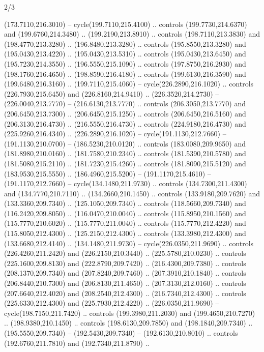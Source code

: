\begin{flagdescription}{2/3}
\begin{scope}[xshift=0.5\flaglength,yshift=0.5\flagwidth,scale=\stretchfactor]
\begin{scope}[scale=0.001645\flagwidth,yshift=65mm,xshift=-63mm]
\begin{scope}[y=0.80pt, x=0.80pt, yscale=-1,]
\begin{scope}[cm={{1.33333,0.0,0.0,1.33333,(0.0,1e-05)}}]
  (173.7110,216.3010) -- cycle(199.7110,215.4100) .. controls
  (199.7730,214.6370) and (199.6760,214.3480) .. (199.2190,213.8910) .. controls
  (198.7110,213.3830) and (198.4770,213.3280) .. (196.8480,213.3280) .. controls
  (195.8550,213.3280) and (195.0430,213.4220) .. (195.0430,213.5310) .. controls
  (195.0430,213.6450) and (195.7230,214.3550) .. (196.5550,215.1090) .. controls
  (197.8750,216.2930) and (198.1760,216.4650) .. (198.8590,216.4180) .. controls
  (199.6130,216.3590) and (199.6480,216.3160) .. (199.7110,215.4060) --
  cycle(226.2890,216.1020) .. controls (226.7930,215.6450) and
  (226.8160,214.9410) .. (226.3520,214.2730) -- (226.0040,213.7770) --
  (216.6130,213.7770) .. controls (206.3050,213.7770) and (206.6450,213.7300) ..
  (206.6450,215.1250) .. controls (206.6450,216.5160) and (206.3130,216.4730) ..
  (216.5550,216.4730) .. controls (224.9180,216.4730) and (225.9260,216.4340) ..
  (226.2890,216.1020) -- cycle(191.1130,212.7660) -- (191.1130,210.0700) --
  (186.5230,210.0120) .. controls (183.0080,209.9650) and (181.8980,210.0160) ..
  (181.7580,210.2340) .. controls (181.5390,210.5780) and (181.5080,215.2110) ..
  (181.7230,215.4260) .. controls (181.8090,215.5120) and (183.9530,215.5550) ..
  (186.4960,215.5200) -- (191.1170,215.4610) -- (191.1170,212.7660) --
  cycle(134.1480,211.9730) .. controls (134.7300,211.4300) and
  (134.7770,210.7110) .. (134.2660,210.1450) .. controls (133.9180,209.7620) and
  (133.3360,209.7340) .. (125.1050,209.7340) .. controls (118.5660,209.7340) and
  (116.2420,209.8050) .. (116.0470,210.0040) .. controls (115.8950,210.1560) and
  (115.7770,210.6020) .. (115.7770,211.0040) .. controls (115.7770,212.4220) and
  (115.8050,212.4300) .. (125.2150,212.4300) .. controls (133.3980,212.4300) and
  (133.6680,212.4140) .. (134.1480,211.9730) -- cycle(226.0350,211.9690) ..
  controls (226.4260,211.2420) and (226.2150,210.3440) .. (225.5780,210.0230) ..
  controls (225.1600,209.8130) and (222.8790,209.7420) .. (216.4300,209.7380) ..
  controls (208.1370,209.7340) and (207.8240,209.7460) .. (207.3910,210.1840) ..
  controls (206.8440,210.7300) and (206.8130,211.4650) .. (207.3130,212.0160) ..
  controls (207.6640,212.4020) and (208.2540,212.4300) .. (216.7340,212.4300) ..
  controls (225.6330,212.4300) and (225.7930,212.4220) .. (226.0350,211.9690) --
  cycle(198.7150,211.7420) .. controls (199.3980,211.2030) and
  (199.4650,210.7270) .. (198.9380,210.1450) .. controls (198.6130,209.7850) and
  (198.1840,209.7340) .. (195.5550,209.7340) -- (192.5430,209.7340) --
  (192.6130,210.8010) .. controls (192.6760,211.7810) and (192.7340,211.8790) ..

\end{scope}
\end{scope}
\end{scope}
\end{scope}
\end{flagdescription}
